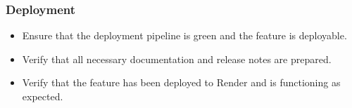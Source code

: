 \subsubsection{Deployment}
\begin{itemize}
    \item Ensure that the deployment pipeline is green and the feature is deployable.
    \item Verify that all necessary documentation and release notes are prepared.
    \item Verify that the feature has been deployed to Render and is functioning as expected.
\end{itemize}
